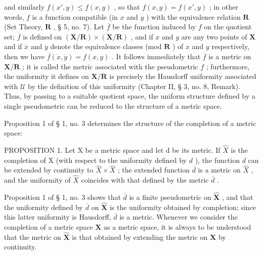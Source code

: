 and similarly \(f(x', y) \leqslant f(x, y)\) , so that \(f(x, y) = f(x', y)\) ; in other words, \(f\) is a function compatible (in \(x\) and \(y\) ) with the equivalence relation \(\mathbf{R}\) (Set Theory, \(\mathbf{R}\) , § 5, no. 7). Let \(\overline{f}\) be the function induced by \(f\) on the quotient set; \(\overline{f}\) is defined on \((\mathbf{X}/\mathbf{R}) \times (\mathbf{X}/\mathbf{R})\) , and if \(x\) and \(y\) are any two points of \(\mathbf{X}\) and if \(\dot{x}\) and \(\dot{y}\) denote the equivalence classes (mod \(\mathbf{R}\) ) of \(x\) and \(y\) respectively, then we have \(\overline{f}(\dot{x}, \dot{y}) = f(x, y)\) . It follows immediately that \(\overline{f}\) is a metric on \(\mathbf{X}/\mathbf{R}\) ; it is called the metric associated with the pseudometric \(f\) ; furthermore, the uniformity it defines on \(\mathbf{X}/\mathbf{R}\) is precisely the Hausdorff uniformity associated with \(\mathcal{U}\) by the definition of this uniformity (Chapter II, § 3, no. 8, Remark). Thus, by passing to a suitable quotient space, the uniform structure defined by a single pseudometric can be reduced to the structure of a metric space.

Proposition 1 of § 1, no. 3 determines the structure of the completion of a metric space:

PROPOSITION 1. Let X be a metric space and let d be its metric. If \(\hat{X}\) is the completion of X (with respect to the uniformity defined by \(d\) ), the function \(d\) can be extended by continuity to \(\hat{X} \times \hat{X}\) ; the extended function \(\overline{d}\) is a metric on \(\hat{X}\) , and the uniformity of \(\hat{X}\) coincides with that defined by the metric \(\overline{d}\) .

Proposition 1 of § 1, no. 3 shows that \(\overline{d}\) is a finite pseudometric on \(\hat{\mathbf{X}}\) , and that the uniformity defined by \(\overline{d}\) on \(\hat{\mathbf{X}}\) is the uniformity obtained by completion; since this latter uniformity is Hausdorff, \(\overline{d}\) is a metric. Whenever we consider the completion of a metric space \(\mathbf{X}\) as a metric space, it is always to be understood that the metric on \(\hat{\mathbf{X}}\) is that obtained by extending the metric on \(\mathbf{X}\) by continuity.

